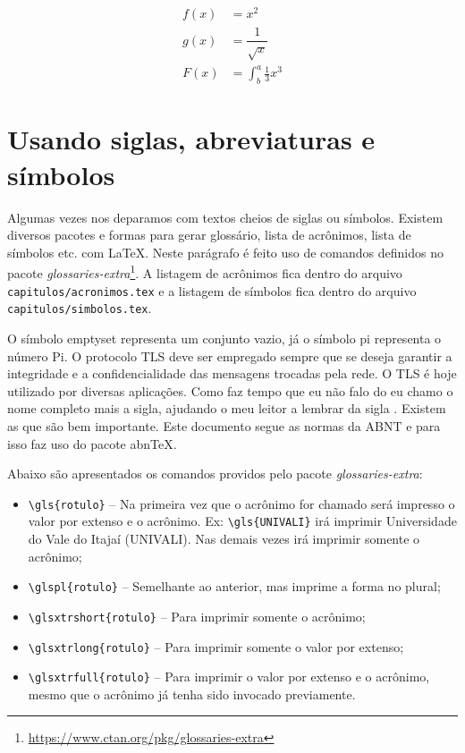 \begin{align}
    f(x) & = x^2 \nonumber                 \\
    g(x) & = \dfrac{1}{\sqrt{x}} \nonumber \\
    F(x) & = \int^a_b \frac{1}{3}x^3
    \label{e_c2_eq2}
\end{align}

\section{Usando siglas, abreviaturas e símbolos}

Algumas vezes nos deparamos com textos cheios de siglas ou símbolos. Existem diversos pacotes e formas para gerar glossário, lista de acrônimos, lista de símbolos etc. com \LaTeX. Neste parágrafo é feito uso de comandos definidos no pacote \textit{glossaries-extra}\footnote{\url{https://www.ctan.org/pkg/glossaries-extra}}. A listagem de acrônimos fica dentro do arquivo \texttt{capitulos/acronimos.tex} e a listagem de símbolos fica dentro do arquivo \texttt{capitulos/simbolos.tex}.

O símbolo \gls{emptyset} representa um conjunto vazio, já o símbolo \gls{pi} representa o número Pi. O protocolo \gls{TLS} deve ser empregado sempre que se deseja garantir a integridade e a confidencialidade das mensagens trocadas pela rede. O \gls{TLS} é hoje utilizado por diversas aplicações. Como faz tempo que eu não falo do  eu chamo o nome completo mais a sigla, ajudando o meu leitor a lembrar da sigla . Existem as  que são bem importante. Este documento segue as normas da \gls{ABNT} e para isso faz uso do pacote \gls{abnTeX}.

Abaixo são apresentados os comandos providos pelo pacote \textit{glossaries-extra}:

\begin{itemize}
    \item \verb+\gls{rotulo}+ -- Na primeira vez que o acrônimo for chamado será impresso o valor por extenso e o acrônimo. Ex: \verb+\gls{UNIVALI}+ irá imprimir Universidade do Vale do Itajaí (UNIVALI). Nas demais vezes irá imprimir somente o acrônimo;
    \item \verb+\glspl{rotulo}+ -- Semelhante ao anterior, mas imprime a forma no plural;
    \item \verb+\glsxtrshort{rotulo}+ -- Para imprimir somente o acrônimo;
    \item \verb+\glsxtrlong{rotulo}+ -- Para imprimir somente o valor por extenso;
    \item \verb+\glsxtrfull{rotulo}+ -- Para imprimir o valor por extenso e o acrônimo, mesmo que o acrônimo já tenha sido invocado previamente.
\end{itemize}




